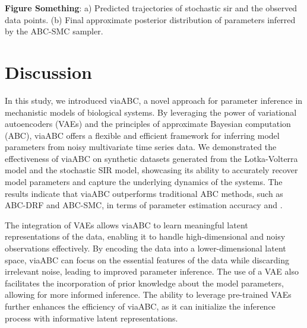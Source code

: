 \documentclass[12pt]{article} %
\newcommand{\blue}[1]{{\color{magenta}{#1}}}
\begin{document}
\textbf{Figure Something}: a) Predicted trajectories of stochastic sir and the observed data points. (b) Final approximate posterior distribution of parameters inferred by the ABC-SMC sampler.





\section*{Discussion}
In this study, we introduced viaABC, a novel approach for parameter inference in mechanistic models of biological systems. By leveraging the power of variational autoencoders (VAEs) and the principles of approximate Bayesian computation (ABC), viaABC offers a flexible and efficient framework for inferring model parameters from noisy multivariate time series data.
We demonstrated the effectiveness of viaABC on synthetic datasets generated from the Lotka-Volterra model and the stochastic SIR model, showcasing its ability to accurately recover model parameters and capture the underlying dynamics of the systems. The results indicate that viaABC outperforms traditional ABC methods, such as ABC-DRF and ABC-SMC, in terms of parameter estimation accuracy and \blue{computational efficiency}.

The integration of VAEs allows viaABC to learn meaningful latent representations of the data, enabling it to handle high-dimensional and noisy observations effectively. By encoding the data into a lower-dimensional latent space, viaABC can focus on the essential features of the data while discarding irrelevant noise, leading to improved parameter inference.
The use of a VAE also facilitates the incorporation of prior knowledge about the model parameters, allowing for more informed inference. The ability to leverage pre-trained VAEs further enhances the efficiency of viaABC, as it can initialize the inference process with informative latent representations.
\end{document}
